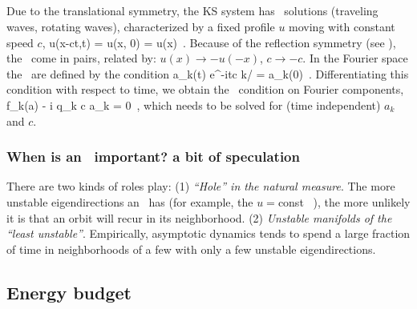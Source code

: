 \subsection{\Reqva}
%

Due to the translational symmetry, 
the KS system has \reqv\ solutions
(traveling waves, rotating waves),
characterized by a fixed profile $u$
moving with constant speed $c$, {\ie}
\beq
 u(x-ct,t) = u(x, 0) = u(x) %
\,.
Because of the reflection symmetry (see ),
the \reqva\ come in pairs,
related by: $u(x) \to -u(-x)$, $c \to -c$.
In the Fourier space the \reqva\ are defined by the condition
\beq
 a_k(t) e^{-itc k/\tildeL} = a_k(0)
\,.
Differentiating this condition with respect to time, we obtain
the \reqv\ condition on Fourier components,
\beq
 f_k(a) - i q_k c a_k = 0 
\,,
which needs to be solved for (time independent) $a_k$ and $c$.

\subsubsection{When is an \eqv\ important? a bit of speculation} 

There are two kinds of roles
{\eqva} play:
(1)
{\em ``Hole'' in the natural measure}.
The more unstable eigendirections an \eqv\ has (for example, the
$u=$const \eqv~), the more unlikely it is  that
an orbit will recur in its neighborhood.
(2)
{\em Unstable manifolds of the ``least unstable''{\eqva}}.
Empirically, asymptotic dynamics tends to spend
a large fraction of time in
neighborhoods of a few  {\eqva} with
only a few unstable eigendirections.


\subsection{Energy budget} %
\label{sec:energy}

